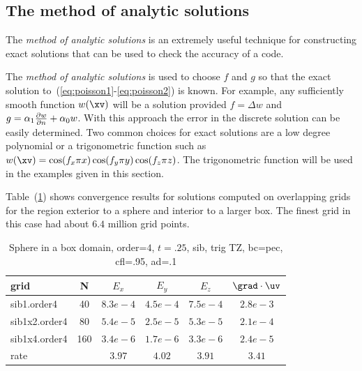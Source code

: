 \newcommand{\format}[2]{$#1$e$#2$}


\subsection{The method of analytic solutions}

The {\it method of analytic solutions} is an extremely useful technique
for constructing exact solutions that can be used to check the accuracy
of a code.

The {\it method of analytic solutions} is used to choose $f$ and $g$
so that the exact solution to~(\ref{eq:poisson1}-\ref{eq:poisson2})
is known. For example, any sufficiently smooth 
function $w(\xv)$ will be a solution provided $f=\Delta w$
and $g = \alpha_1 {\partial w \over \partial n} + \alpha_0 w$. 
With this approach the error in the discrete solution can be easily determined. 
Two common choices for exact solutions are a low degree polynomial
or a trigonometric function such as
$w(\xv) = \cos( f_x \pi x)\cos( f_y \pi y )\cos( f_z \pi z)$. 
The trigonometric function will be used in the examples given in this section.

Table~(\ref{table:mx.sib}) shows convergence results for solutions computed
on overlapping grids for the region exterior to a sphere and interior to a larger box. The finest grid
in this case had about $6.4$ million grid points.
\begin{table}[hbt]
\begin{center}
\begin{tabular}{|l|c|c|c|c|c|} \hline\hline 
grid  & N &  $E_x$ &  $E_y$ & $E_z$ & $\grad\cdot\uv$\\ \hline 
         sib1.order4 &    40 &$8.3 e-4$ &$4.5 e-4$ &$7.5 e-4$ &$2.8 e-3$  \\ \hline
       sib1x2.order4 &    80 &$5.4 e-5$ &$2.5 e-5$ &$5.3 e-5$ &$2.1 e-4$  \\ \hline
       sib1x4.order4 &   160 &$3.4 e-6$ &$1.7 e-6$ &$3.3 e-6$ &$2.4 e-5$  \\ \hline
    rate         &     &       $3.97$ &       $4.02$ &       $3.91$ &       $3.41$  \\ \hline\hline
\end{tabular}
\caption{Sphere in a box domain, order=$4$, $t=.25$, sib, trig TZ, bc=pec, cfl=.95, ad=.1}\label{table:mx.sib}
\end{center}
\end{table}


